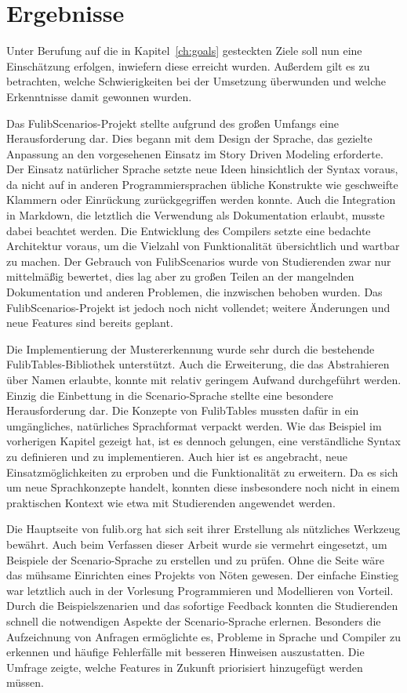 \chapter{Ergebnisse}\label{ch:ergebnisse}

Unter Berufung auf die in Kapitel~\ref{ch:goals} gesteckten Ziele soll nun eine Einschätzung erfolgen, inwiefern diese erreicht wurden.
Außerdem gilt es zu betrachten, welche Schwierigkeiten bei der Umsetzung überwunden und welche Erkenntnisse damit gewonnen wurden.

Das FulibScenarios-Projekt stellte aufgrund des großen Umfangs eine Herausforderung dar.
Dies begann mit dem Design der Sprache, das gezielte Anpassung an den vorgesehenen Einsatz im Story Driven Modeling erforderte.
Der Einsatz natürlicher Sprache setzte neue Ideen hinsichtlich der Syntax voraus, da nicht auf in anderen Programmiersprachen übliche Konstrukte wie geschweifte Klammern oder Einrückung zurückgegriffen werden konnte.
Auch die Integration in Markdown, die letztlich die Verwendung als Dokumentation erlaubt, musste dabei beachtet werden.
Die Entwicklung des Compilers setzte eine bedachte Architektur voraus, um die Vielzahl von Funktionalität übersichtlich und wartbar zu machen.
Der Gebrauch von FulibScenarios wurde von Studierenden zwar nur mittelmäßig bewertet,
dies lag aber zu großen Teilen an der mangelnden Dokumentation und anderen Problemen, die inzwischen behoben wurden.
Das FulibScenarios-Projekt ist jedoch noch nicht vollendet;
weitere Änderungen und neue Features sind bereits geplant.

Die Implementierung der Mustererkennung wurde sehr durch die bestehende FulibTables-Bibliothek unterstützt.
Auch die Erweiterung, die das Abstrahieren über Namen erlaubte, konnte mit relativ geringem Aufwand durchgeführt werden.
Einzig die Einbettung in die Scenario-Sprache stellte eine besondere Herausforderung dar.
Die Konzepte von FulibTables mussten dafür in ein umgängliches, natürliches Sprachformat verpackt werden.
Wie das Beispiel im vorherigen Kapitel gezeigt hat, ist es dennoch gelungen, eine verständliche Syntax zu definieren und zu implementieren.
Auch hier ist es angebracht, neue Einsatzmöglichkeiten zu erproben und die Funktionalität zu erweitern.
Da es sich um neue Sprachkonzepte handelt, konnten diese insbesondere noch nicht in einem praktischen Kontext wie etwa mit Studierenden angewendet werden.

Die Hauptseite von fulib.org hat sich seit ihrer Erstellung als nützliches Werkzeug bewährt.
Auch beim Verfassen dieser Arbeit wurde sie vermehrt eingesetzt, um Beispiele der Scenario-Sprache zu erstellen und zu prüfen.
Ohne die Seite wäre das mühsame Einrichten eines Projekts von Nöten gewesen.
Der einfache Einstieg war letztlich auch in der Vorlesung Programmieren und Modellieren von Vorteil.
Durch die Beispielszenarien und das sofortige Feedback konnten die Studierenden schnell die notwendigen Aspekte der Scenario-Sprache erlernen.
Besonders die Aufzeichnung von Anfragen ermöglichte es, Probleme in Sprache und Compiler zu erkennen und häufige Fehlerfälle mit besseren Hinweisen auszustatten.
Die Umfrage zeigte, welche Features in Zukunft priorisiert hinzugefügt werden müssen.

